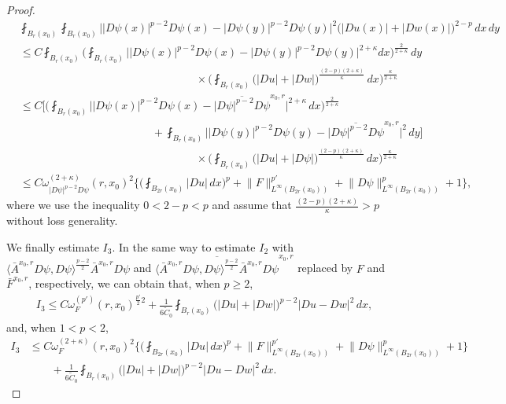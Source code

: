 \documentclass[reqno]{amsart}
\numberwithin{equation}{section}
\theoremstyle{plain}
\theoremstyle{definition}
\theoremstyle{remark}
\providecommand{\biggset}[1]{\biggl\{#1\biggr\}}
\providecommand{\abs}[1]{\lvert#1\rvert}
\providecommand{\ip}[1]{\langle#1\rangle}
\providecommand{\norm}[1]{\lVert#1\rVert}
\begin{document}
\begin{proof}
\begin{align*}
&\fint_{B_r(x_0)}  \fint_{B_r(x_0)}   \big| \abs{D\psi(x)}^{p-2}D\psi(x)-\abs{D\psi(y)}^{p-2}D\psi(y) \big|^{2} \big( \abs{Du(x)}+\abs{Dw(x)}\big)^{2-p}\,dx \,dy  \\
& \leq C \fint_{B_r(x_0)}   \bigg( \fint_{B_r(x_0)} \big| \abs{D\psi(x)}^{p-2}D\psi(x)-\abs{D\psi(y)}^{p-2}D\psi(y) \big|^{2+\kappa} dx \bigg)^{\frac{2}{2+\kappa}} \, dy \\
&\qquad\qquad\qquad\qquad \qquad\qquad\qquad\qquad \times\bigg( \fint_{B_r(x_0)} \big( \abs{Du}+\abs{Dw}\big)^{\frac{(2-p)(2+\kappa)}{\kappa}} \,dx \bigg)^{\frac{ \kappa}{2+\kappa}} \\
&\leq C\bigg[   \bigg( \fint_{B_r(x_0)} \big| \abs{D\psi(x)}^{p-2}D\psi(x)-\overline{\abs{D\psi}^{p-2}D\psi}^{x_0,r} \big|^{2+\kappa}  \, dx  \bigg)^{\frac{2}{2+\kappa}}\\
&\qquad\qquad\qquad\qquad\qquad\qquad+  \fint_{B_r(x_0)}\big| \abs{D\psi(y)}^{p-2}D\psi(y)-\overline{\abs{D\psi}^{p-2}D\psi}^{x_0,r} \big|^2\, dy \bigg]\\
&\qquad\qquad\qquad\qquad \qquad\qquad\qquad\qquad \times\bigg( \fint_{B_r(x_0)} \big( \abs{Du}+\abs{D\psi}\big)^{\frac{(2-p)(2+\kappa)}{\kappa}} \,dx \bigg)^{\frac{ \kappa}{2+\kappa}} \\
&\leq C\omega_{|D\psi|^{p-2}D\psi}^{(2+\kappa)}(r,x_0)^2 \biggset{    \bigg(\fint_{B_{2r}(x_0)} \abs{Du}\, dx\bigg)^p +  \norm{F}_{L^\infty(B_{2r}(x_0))}
^{p'}+\norm{D\psi}_{L^\infty(B_{2r}(x_0))}^p   +1  },
\end{align*}
where we use the inequality $0<2-p<p$ and assume that $\frac{(2-p)(2+\kappa)}{\kappa}>p$ without loss generality. 
 

We finally estimate $I_3$. In the same way to estimate $I_2$ with $\ip{\bar{A}^{x_0,r} D\psi, D\psi}^{\frac{p-2}{2}} \bar{A}^{x_0,r} D\psi$ and
$\overline{\ip{\bar{A}^{x_0,r}D\psi, D\psi}^{\frac{p-2}{2}} \bar{A}^{x_0,r} D\psi}^{x_0,r}$ replaced by $F$ and $\bar{F}^{x_0,r}$, respectively, we can obtain that, when $p\ge 2$, 
\begin{align*}
I_3
\leq C \omega_F^{(p')}  (r,x_0)  ^{\frac{p'}{2}2 }+\frac{1}{6\tilde C_0} \fint_{B_r(x_0)} \big(  \abs{Du}+\abs{Dw} \big)^{p-2}\abs{Du-Dw}^2  \, dx, %
\end{align*}
and, when $1<p<2$,   
\begin{align*}
I_3&\leq  C\omega_F^{(2+\kappa)}(r,x_0)^2 \biggset{    \bigg(\fint_{B_{2r}(x_0)} \abs{Du}\, dx\bigg)^p+   \norm{F}_{L^\infty(B_{2r}(x_0))}
^{p'}+\norm{D\psi}_{L^\infty(B_{2r}(x_0))}^p +1   }  \\
&\qquad +\frac{1}{6\tilde C_0} \fint_{B_r(x_0)} \big(  \abs{Du}+\abs{Dw} \big)^{p-2}\abs{Du-Dw}^2 \, dx.
\end{align*}




\end{proof}
\end{document}
